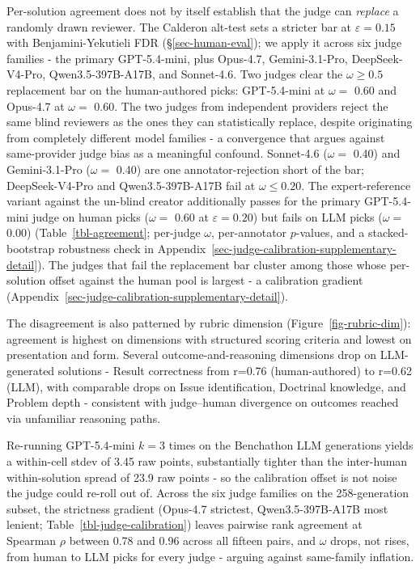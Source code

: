 \documentclass[11pt]{article}
\begin{document}
Per-solution agreement does not by itself establish that the judge can
\emph{replace} a randomly drawn reviewer. The Calderon alt-test sets a
stricter bar at \(\varepsilon=0.15\) with Benjamini-Yekutieli FDR
(§\ref{sec-human-eval}); we apply it across six judge families - the
primary GPT-5.4-mini, plus Opus-4.7, Gemini-3.1-Pro, DeepSeek-V4-Pro,
Qwen3.5-397B-A17B, and Sonnet-4.6. Two judges clear the
\(\omega \geq 0.5\) replacement bar on the human-authored picks:
GPT-5.4-mini at \(\omega=\) 0.60 and Opus-4.7 at \(\omega=\) 0.60. The
two judges from independent providers reject the same blind reviewers as
the ones they can statistically replace, despite originating from
completely different model families - a convergence that argues against
same-provider judge bias as a meaningful confound. Sonnet-4.6
(\(\omega=\) 0.40) and Gemini-3.1-Pro (\(\omega=\) 0.40) are one
annotator-rejection short of the bar; DeepSeek-V4-Pro and
Qwen3.5-397B-A17B fail at \(\omega \leq 0.20\). The expert-reference
variant against the un-blind creator additionally passes for the primary
GPT-5.4-mini judge on human picks (\(\omega=\) 0.60 at
\(\varepsilon=0.20\)) but fails on LLM picks (\(\omega=\) 0.00)
(Table~\ref{tbl-agreement}; per-judge \(\omega\), per-annotator
\(p\)-values, and a stacked-bootstrap robustness check in
Appendix~\ref{sec-judge-calibration-supplementary-detail}). The judges
that fail the replacement bar cluster among those whose per-solution
offset against the human pool is largest - a calibration gradient
(Appendix~\ref{sec-judge-calibration-supplementary-detail}).

The disagreement is also patterned by rubric dimension
(Figure~\ref{fig-rubric-dim}): agreement is highest on dimensions with
structured scoring criteria and lowest on presentation and form. Several
outcome-and-reasoning dimensions drop on LLM-generated solutions -
Result correctness from r=0.76 (human-authored) to r=0.62 (LLM), with
comparable drops on Issue identification, Doctrinal knowledge, and
Problem depth - consistent with judge--human divergence on outcomes
reached via unfamiliar reasoning paths.

Re-running GPT-5.4-mini \(k=3\) times on the Benchathon LLM generations
yields a within-cell stdev of 3.45 raw points, substantially tighter
than the inter-human within-solution spread of 23.9 raw points - so the
calibration offset is not noise the judge could re-roll out of. Across
the six judge families on the 258-generation subset, the strictness
gradient (Opus-4.7 strictest, Qwen3.5-397B-A17B most lenient;
Table~\ref{tbl-judge-calibration}) leaves pairwise rank agreement at
Spearman \(\rho\) between 0.78 and 0.96 across all fifteen pairs, and
\(\omega\) drops, not rises, from human to LLM picks for every judge -
arguing against same-family inflation.
\end{document}
